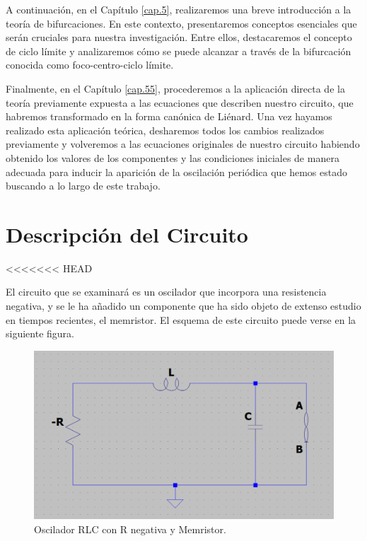 \documentclass[12pt,a4paper]{report} %
\begin{document}
	\vspace{0.5cm} A continuación, en el Capítulo \ref{cap.5}, realizaremos una breve introducción a la teoría de bifurcaciones. En este contexto, presentaremos conceptos esenciales que serán cruciales para nuestra investigación. Entre ellos, destacaremos el concepto de ciclo límite y analizaremos cómo se puede alcanzar a través de la bifurcación conocida como foco-centro-ciclo límite.
	
	\vspace{0.5cm} Finalmente, en el Capítulo \ref{cap.55}, procederemos a la aplicación directa de la teoría previamente expuesta a las ecuaciones que describen nuestro circuito, que habremos transformado en la forma canónica de Liénard. Una vez hayamos realizado esta aplicación teórica, desharemos todos los cambios realizados previamente y volveremos a las ecuaciones originales de nuestro circuito habiendo obtenido los valores de los componentes y las condiciones iniciales de manera adecuada para inducir la aparición de la oscilación periódica que hemos estado buscando a lo largo de este trabajo.
	
	
	\newpage
	
	\chapter{Descripción del Circuito}
<<<<<<< HEAD
	\label{cap.1}

	El circuito que se examinará es un oscilador que incorpora una resistencia negativa, y se le ha añadido un componente que ha sido objeto de extenso estudio en tiempos recientes, el memristor. El esquema de este circuito puede verse en la siguiente figura.
	
	\vspace{0.5cm}\begin{figure}[h]
		\centering
		\includegraphics[width=1\textwidth]{-RLCM.png}
		\caption{Oscilador RLC con R negativa y Memristor.}
		\label{fig:-RLCM}
	\end{figure}\smallskip
	
\end{document}
